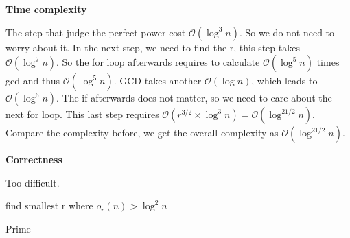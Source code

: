 \documentclass[catalog.tex]{subfiles}
\begin{document}
\textbf{Time complexity}

The step that judge the perfect power cost $\mathcal{O}(\log^{3} n)$\cite{agrawal2004primes}. So we do not need to worry about it. In the next step, we need to find the r, this step takes $\mathcal{O}(\log^{7} n)$\cite{agrawal2004primes}. So the for loop afterwards requires to calculate $\mathcal{O}(\log^{5} n)$ times gcd and thus $\mathcal{O}(\log^{5} n)$. GCD takes another $\mathcal{O}(\log n)$, which leads to $\mathcal{O}(\log^{6} n)$. The if afterwards does not matter, so we need to care about the next for loop. This last step requires $\mathcal{O}(r^{3/2}\times \log^{3} n) = \mathcal{O}(\log^{21/2} n)$\cite{agrawal2004primes}. Compare the complexity before, we get the overall complexity as $\mathcal{O}(\log^{21/2} n)$.

\textbf{Correctness}

Too difficult.

\begin{Algorithm}[AKS\label{alg:\currfilebase}]

	find smallest r where $o_{r}(n)>\log ^{2} n$




	\Ret Prime

\end{Algorithm}


\singlespacing
\printbibliography[title={References.},resetnumbers=true,heading=subbibliography]
\end{document}
